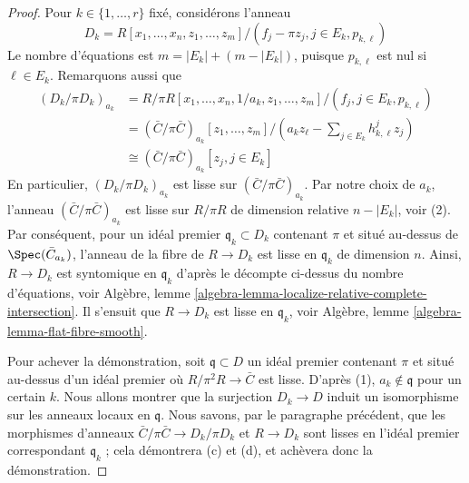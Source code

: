 \begin{proof}
\medskip\noindent
Pour $k \in \{1, \ldots, r\}$ fixé, considérons l'anneau
$$
D_k = R[x_1, \ldots, x_n, z_1, \ldots, z_m]/
(f_j - \pi z_j, j \in E_k, p_{k, \ell})
$$
Le nombre d'équations est $m = |E_k| + (m - |E_k|)$, puisque $p_{k, \ell}$
est nul si $\ell \in E_k$. Remarquons aussi que
\begin{align*}
(D_k/\pi D_k)_{a_k}
& =
R/\pi R[x_1, \ldots, x_n, 1/a_k, z_1, \ldots, z_m]/
(f_j, j \in E_k, p_{k, \ell}) \\
& =
(\bar C/\pi \bar C)_{a_k}[z_1, \ldots, z_m]/
(a_kz_\ell - \sum\nolimits_{j \in E_k} h_{k, \ell}^j z_j) \\
& \cong
(\bar C/\pi \bar C)_{a_k}[z_j, j \in E_k]
\end{align*}
En particulier, $(D_k/\pi D_k)_{a_k}$ est lisse sur $(\bar C/\pi \bar C)_{a_k}$.
Par notre choix de $a_k$, l'anneau $(\bar C/\pi \bar C)_{a_k}$ est lisse
sur $R/\pi R$ de dimension relative $n - |E_k|$, voir (2). Par conséquent,
pour un idéal premier $\mathfrak q_k \subset D_k$ contenant $\pi$ et situé au-dessus de
$\Spec(\bar C_{a_k})$, l'anneau de la fibre de $R \to D_k$
est lisse en $\mathfrak q_k$ de dimension $n$. Ainsi, $R \to D_k$ est syntomique
en $\mathfrak q_k$ d'après le décompte ci-dessus du nombre d'équations, voir
Algèbre, lemme \ref{algebra-lemma-localize-relative-complete-intersection}.
Il s'ensuit que $R \to D_k$ est lisse en $\mathfrak q_k$, voir
Algèbre, lemme \ref{algebra-lemma-flat-fibre-smooth}.

\medskip\noindent
Pour achever la démonstration, soit $\mathfrak q \subset D$ un idéal premier
contenant $\pi$ et situé au-dessus d'un idéal premier où $R/\pi^2 R \to \bar C$
est lisse. D'après (1), $a_k \not \in \mathfrak q$ pour un certain $k$.
Nous allons montrer que la surjection $D_k \to D$ induit
un isomorphisme sur les anneaux locaux en $\mathfrak q$. Nous savons, par le
paragraphe précédent, que les morphismes d'anneaux
$\bar C/\pi \bar C \to D_k/\pi D_k$ et $R \to D_k$ sont lisses en
l'idéal premier correspondant $\mathfrak q_k$ ; cela démontrera (c) et (d),
et achèvera donc la démonstration.


\end{proof}
